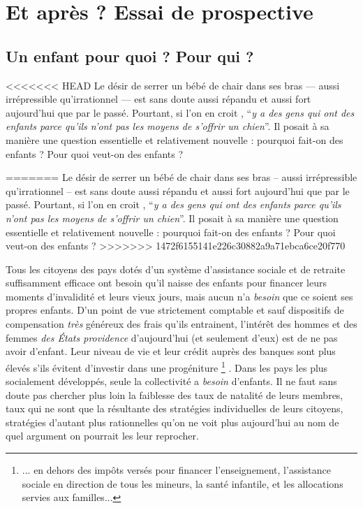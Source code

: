 

\part{Et après ? Essai de prospective}


\chapter{Un enfant pour quoi ? Pour qui ?}


<<<<<<< HEAD
Le désir de serrer un bébé de chair dans ses bras --- aussi irrépressible qu'irrationnel --- est sans doute aussi répandu et aussi fort aujourd'hui que par le passé. Pourtant, si l'on en croit , \enquote{\emph{y a des gens qui ont des enfants parce qu'ils n'ont pas les moyens de s'offrir un chien}}. Il posait à sa manière une question essentielle et relativement nouvelle : pourquoi fait-on des enfants ? Pour quoi veut-on des enfants ?
 
=======
Le désir de serrer un bébé de chair dans ses bras -- aussi irrépressible qu'irrationnel -- est sans doute aussi répandu et aussi fort aujourd'hui que par le passé. Pourtant, si l'on en croit , \enquote{\emph{y a des gens qui ont des enfants parce qu'ils n'ont pas les moyens de s'offrir un chien}}. Il posait à sa manière une question essentielle et relativement nouvelle : pourquoi fait-on des enfants ? Pour quoi veut-on des enfants ?
>>>>>>> 1472f6155141e226c30882a9a71ebca6ce20f770

 
 Tous les citoyens des pays dotés d'un système d'assistance sociale et de retraite suffisamment efficace ont besoin qu'il naisse des enfants pour financer leurs moments d'invalidité et leurs vieux jours, mais aucun n'a \emph{besoin} que ce soient ses propres enfants. D'un point de vue strictement comptable et sauf dispositifs de compensation \emph{très}  généreux des frais qu'ils entrainent, l'intérêt des hommes et des femmes \emph{des États providence} d'aujourd'hui (et seulement d'eux) est de ne pas avoir d'enfant. Leur niveau de vie et leur crédit auprès des banques sont plus élevés s'ils évitent d'investir dans une progéniture%
\footnote{... en dehors des impôts versés pour financer l'enseignement, l'assistance sociale en direction de tous les mineurs, la santé infantile, et les allocations servies aux familles...}%
. Dans les pays les plus socialement développés, seule la collectivité a \emph{besoin} d'enfants. Il ne faut sans doute pas chercher plus loin la faiblesse des taux de natalité de leurs membres, taux qui ne sont que la résultante des stratégies individuelles de leurs citoyens, stratégies d'autant plus rationnelles qu'on ne voit plus aujourd'hui au nom de quel argument on pourrait les leur reprocher. 
 
